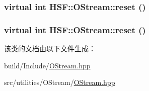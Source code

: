 \label{classHSF_1_1OStream_ab478550e6310a030950dd8d8f354562b}
\hypertarget{classHSF_1_1OStream_ac3d63743046e59e7f27aa3dde0f6b68c}{
\subsubsection[{reset}]{\setlength{\rightskip}{0pt plus 5cm}virtual int HSF::OStream::reset ()}}
\label{classHSF_1_1OStream_ac3d63743046e59e7f27aa3dde0f6b68c}
\hypertarget{classHSF_1_1OStream_ac3d63743046e59e7f27aa3dde0f6b68c}{
\subsubsection[{reset}]{\setlength{\rightskip}{0pt plus 5cm}virtual int HSF::OStream::reset ()}}
\label{classHSF_1_1OStream_ac3d63743046e59e7f27aa3dde0f6b68c}


该类的文档由以下文件生成：\begin{DoxyCompactItemize}
\item 
build/Include/\hyperlink{build_2Include_2OStream_8hpp}{OStream.hpp}\item 
src/utilities/OStream/\hyperlink{src_2utilities_2OStream_2OStream_8hpp}{OStream.hpp}\end{DoxyCompactItemize}
